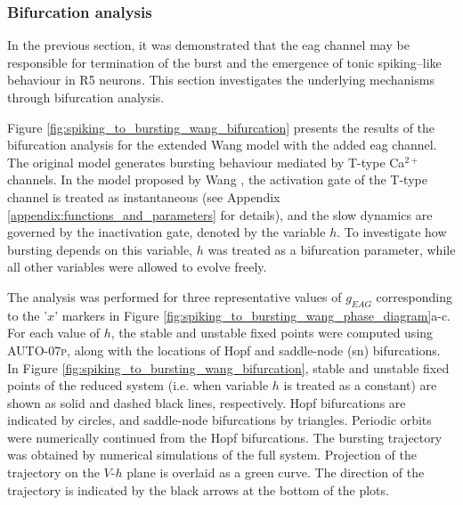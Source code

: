 \documentclass[../main.tex]{subfiles}
\begin{document}

\subsubsection{Bifurcation analysis} \label{subsubsec:spiking_to_bursting_bifurcation}

\noindent In the previous section, it was demonstrated that the \gls{eag} channel may be responsible for termination of the burst and the emergence of tonic spiking–like behaviour in R5 neurons. This section investigates the underlying mechanisms through bifurcation analysis.

Figure \ref{fig:spiking_to_bursting_wang_bifurcation} presents the results of the bifurcation analysis for the extended Wang model with the added \gls{eag} channel. The original model generates bursting behaviour mediated by T-type Ca$^{2+}$ channels. In the model proposed by Wang \parencite{wangMultipleDynamicalModes1994}, the activation gate of the T-type channel is treated as instantaneous (see Appendix \ref{appendix:functions_and_parameters} for details), and the slow dynamics are governed by the inactivation gate, denoted by the variable $h$. To investigate how bursting depends on this variable, $h$ was treated as a bifurcation parameter, while all other variables were allowed to evolve freely.

The analysis was performed for three representative values of $g_{EAG}$ corresponding to the '$x$' markers in Figure \ref{fig:spiking_to_bursting_wang_phase_diagram}a-c. For each value of $h$, the stable and unstable fixed points were computed using \textsc{AUTO-07p}, along with the locations of Hopf and saddle-node (\gls{sn}) bifurcations. In Figure \ref{fig:spiking_to_bursting_wang_bifurcation}, stable and unstable fixed points of the reduced system (i.e. when variable $h$ is treated as a constant) are shown as solid and dashed black lines, respectively.
Hopf bifurcations are indicated by circles, and saddle-node bifurcations by triangles. Periodic orbits were numerically continued from the Hopf bifurcations. The bursting trajectory was obtained by numerical simulations of the full system. Projection of the trajectory on the $V$-$h$ plane is overlaid as a green curve. The direction of the trajectory is indicated by the black arrows at the bottom of the plots.
\end{document}
